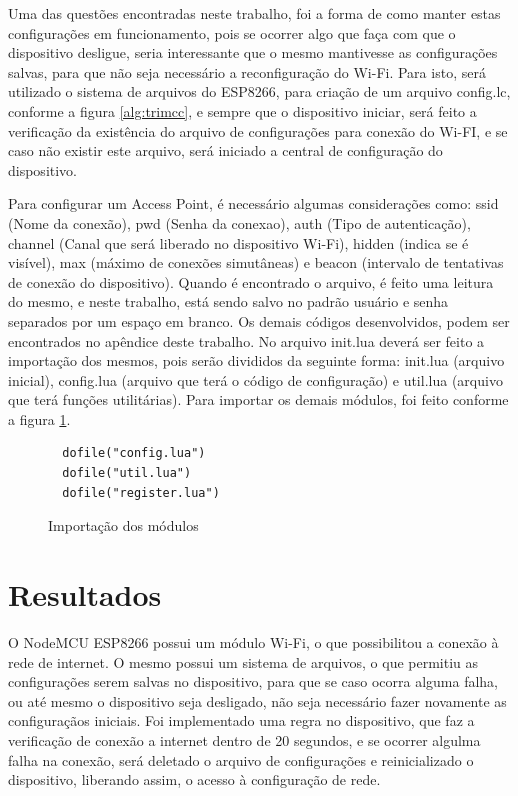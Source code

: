 \documentclass[journal]{IEEEtran}
\begin{document}
Uma das questões encontradas neste trabalho, foi a forma de como manter estas configurações em funcionamento, pois se ocorrer algo que faça com que o dispositivo desligue, seria interessante que o mesmo mantivesse as configurações salvas, para que não seja necessário a reconfiguração do Wi-Fi. Para isto, será utilizado o sistema de arquivos do ESP8266, para criação de um arquivo config.lc, conforme a figura \ref{alg:trimcc}, e sempre que o dispositivo iniciar, será feito a verificação da existência do arquivo de configurações para conexão do Wi-FI, e se caso não existir este arquivo, será iniciado a central de configuração do dispositivo.

Para configurar um Access Point, é necessário algumas considerações como: ssid (Nome da conexão), pwd (Senha da conexao), auth (Tipo de autenticação), channel (Canal que será liberado no dispositivo Wi-Fi), hidden (indica se é visível), max (máximo de conexões simutâneas) e beacon (intervalo de tentativas de conexão do dispositivo). Quando é encontrado o arquivo, é feito uma leitura do mesmo, e neste trabalho, está sendo salvo no padrão usuário e senha separados por um espaço em branco. Os demais códigos desenvolvidos, podem ser encontrados no apêndice deste trabalho. No arquivo init.lua deverá ser feito a importação dos mesmos, pois serão divididos da seguinte forma: init.lua (arquivo inicial), config.lua (arquivo que terá o código de configuração) e util.lua (arquivo que terá funções utilitárias). Para importar os demais módulos, foi feito conforme a figura \ref{alg:importsdofile}.

\begin{figure}[H]
\begin{lstlisting} 
  dofile("config.lua")
  dofile("util.lua")
  dofile("register.lua")
\end{lstlisting}

\caption{Importação dos módulos}
\label{alg:importsdofile}
\end{figure}


\section{Resultados}
O NodeMCU ESP8266 possui um módulo Wi-Fi, o que possibilitou a conexão à rede de internet. O mesmo possui um sistema de arquivos, o que permitiu as configurações serem salvas no dispositivo, para que se caso ocorra alguma falha, ou até mesmo o dispositivo seja desligado, não seja necessário fazer novamente as configuraçãos iniciais. Foi implementado uma regra no dispositivo, que faz a verificação de conexão a internet dentro de 20 segundos, e se ocorrer algulma falha na conexão, será deletado o arquivo de configurações e reinicializado o dispositivo, liberando assim, o acesso à configuração de rede.
\end{document}
